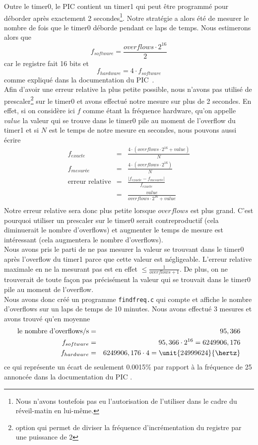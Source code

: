 \documentclass[12pt,a4paper]{article}
\begin{document}
 Outre le timer0, le PIC contient un timer1 qui peut être programmé pour déborder après exactement 2 secondes\footnote{Nous n'avons toutefois pas eu l'autorisation de l'utiliser dans le cadre du réveil-matin en lui-même.}.  Notre stratégie a alors été de mesurer le nombre de fois que le timer0 déborde pendant ce laps de temps. Nous estimerons alors que $$f_{software} = \frac{overflows \cdot 2^{16}}{2}$$ car le registre fait 16 bits et $$f_{hardware} = 4 \cdot f_{software}$$ comme expliqué dans la documentation du PIC~\cite{microchipDS}.\\
 
 Afin d'avoir une erreur relative la plus petite possible, nous n'avons pas utilisé de prescaler\footnote{option qui permet de diviser la fréquence d'incrémentation du registre par une puissance de 2} sur le timer0 et avons effectué notre mesure sur plus de 2 secondes. En effet, si on considère ici $f$ comme étant la fréquence hardware, qu'on appelle $value$ la valeur qui se trouve dans le timer0 pile au moment de l'overflow du timer1 et si $N$ est le temps de notre mesure en secondes, nous pouvons aussi écrire
 \begin{eqnarray*}
 f_{exacte} &=& \frac{4 \cdot (overflows \cdot 2^{16} + value)}{N}\\
f_{mesurée} &=&  \frac{4 \cdot (overflows \cdot 2^{16})}{N}\\
 \text{erreur relative} &=& \frac{|f_{exacte} - f_{mesurée}|}{f_{exacte}}\\
                      &=& \frac{value}{overflows \cdot 2^{16} + value}\\
\end{eqnarray*}
 Notre erreur relative sera donc plus petite lorsque $overflows$ est plus grand. C'est pourquoi utiliser un prescaler sur le timer0 serait contreproductif (cela diminuerait le nombre d'overflows) et augmenter le temps de mesure est intéressant (cela augmentera le nombre d'overflows).\\
 
 Nous avons pris le parti de ne pas mesurer la valeur se trouvant dans le timer0 après l'overflow du timer1 parce que cette valeur est négligeable. L'erreur relative maximale en ne la mesurant pas est en effet $\leq \frac{1}{overflows + 1}$. De plus, on ne trouverait de toute façon pas précisément la valeur qui se
 trouvait dans le timer0 pile au moment de l'overflow.\\
 
Nous avons donc créé un programme \texttt{findfreq.c} qui compte et affiche le nombre d'overflows sur un laps de temps de 10 minutes. Nous avons effectué 3 mesures et avons trouvé qu'en moyenne
  \begin{eqnarray*}
 \text{le nombre d'overflows/s} &=& 95,366\\
f_{software}  &=& 95,366 \cdot 2^{16} = 6249906,176\\
f_{hardware} &=& 6249906,176 \cdot 4 = \unit{24999624}{\hertz}
 \end{eqnarray*}
 ce qui représente un écart de seulement 0.0015\% par rapport à la fréquence de \unit{25}{\mega\hertz} annoncée dans la documentation du PIC \cite{microchipDS}.
 
\end{document}
